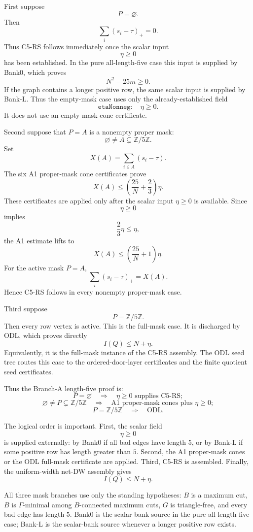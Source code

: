 First suppose
\[
P=\varnothing.
\]
Then
\[
\sum_i(s_i-\tau)_+=0.
\]
Thus C5-RS follows immediately once the scalar input
\[
\eta\ge 0
\]
has been established.  In the pure all-length-five case this input is supplied by Bank0, which proves
\[
N^2-25m\ge0.
\]
If the graph contains a longer positive row, the same scalar input is supplied by Bank-L.  Thus the empty-mask case uses only the already-established field
\[
\texttt{etaNonneg}:\quad \eta\ge0.
\]
It does not use an empty-mask cone certificate.

Second suppose that \(P=A\) is a nonempty proper mask:
\[
\varnothing\ne A\subsetneq \mathbb Z/5\mathbb Z.
\]
Set
\[
X(A)=\sum_{i\in A}(s_i-\tau).
\]
The six A1 proper-mask cone certificates prove
\[
X(A)\le
\left(\frac{25}{N}+\frac23\right)\eta.
\]
These certificates are applied only after the scalar input \(\eta\ge0\) is available.  Since
\[
\eta\ge0
\]
implies
\[
\frac23\eta\le \eta,
\]
the A1 estimate lifts to
\[
X(A)\le
\left(\frac{25}{N}+1\right)\eta.
\]
For the active mask \(P=A\),
\[
\sum_i(s_i-\tau)_+=X(A).
\]
Hence C5-RS follows in every nonempty proper-mask case.

Third suppose
\[
P=\mathbb Z/5\mathbb Z.
\]
Then every row vertex is active.  This is the full-mask case.  It is discharged by ODL, which proves directly
\[
I(Q)\le N+\eta.
\]
Equivalently, it is the full-mask instance of the C5-RS assembly.  The ODL seed tree routes this case to the ordered-door-layer certificates and the finite quotient seed certificates.

Thus the Branch-A length-five proof is:
\[
P=\varnothing
\quad\Longrightarrow\quad
\eta\ge0\text{ supplies C5-RS};
\]
\[
\varnothing\ne P\subsetneq \mathbb Z/5\mathbb Z
\quad\Longrightarrow\quad
\text{A1 proper-mask cones plus }\eta\ge0;
\]
\[
P=\mathbb Z/5\mathbb Z
\quad\Longrightarrow\quad
\text{ODL}.
\]

The logical order is important.  First, the scalar field
\[
\eta\ge0
\]
is supplied externally: by Bank0 if all bad edges have length \(5\), or by Bank-L if some positive row has length greater than \(5\).  Second, the A1 proper-mask cones or the ODL full-mask certificate are applied.  Third, C5-RS is assembled.  Finally, the uniform-width net-DW assembly gives
\[
I(Q)\le N+\eta.
\]

All three mask branches use only the standing hypotheses: \(B\) is a maximum cut, \(B\) is \(\Gamma\)-minimal among \(B\)-connected maximum cuts, \(G\) is triangle-free, and every bad edge has length \(5\).  Bank0 is the scalar-bank source in the pure all-length-five case; Bank-L is the scalar-bank source whenever a longer positive row exists.
